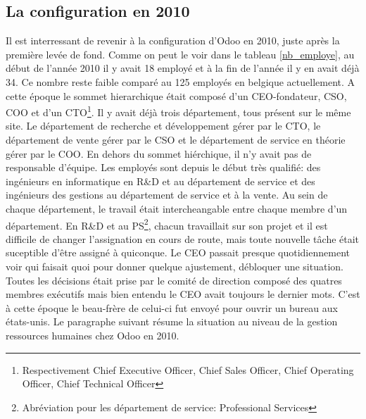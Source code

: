\subsection{La configuration en 2010}
Il est interressant de revenir à la configuration d'Odoo en 2010, juste après la première levée de fond. Comme on peut le voir dans le tableau \ref{nb_employe}, au début de l'année 2010 il y avait 18 employé et à la fin de l'année il y en avait déjà 34. Ce nombre reste faible comparé au 125 employés en belgique actuellement. A cette époque le sommet hierarchique était composé d'un CEO-fondateur, CSO, COO et d'un CTO\footnote{Respectivement Chief Executive Officer, Chief Sales Officer, Chief Operating Officer, Chief Technical Officer}. Il y avait déjà trois département, tous présent sur le même site. Le département de recherche et développement gérer par le CTO, le département de vente gérer par le CSO et le département de service en théorie gérer par le COO. En dehors du sommet hiérchique, il n'y avait pas de responsable d'équipe. Les employés sont depuis le début très qualifié: des ingénieurs en informatique en R\&D et au département de service et des ingénieurs des gestions au département de service et à la vente. Au sein de chaque département, le travail était intercheangable entre chaque membre d'un département. En R\&D et au PS\footnote{Abréviation pour les département de service: Professional Services}, chacun travaillait sur son projet et il est difficile de changer l'assignation en cours de route, mais toute nouvelle tâche était suceptible d'être assigné à quiconque. Le CEO passait presque quotidiennement voir qui faisait quoi pour donner quelque ajustement, débloquer une situation. Toutes les décisions était prise par le comité de direction composé des quatres membres exécutifs mais bien entendu le CEO avait toujours le dernier mots. C'est à cette époque le beau-frère de celui-ci fut envoyé pour ouvrir un bureau aux états-unis. Le paragraphe suivant résume la situation au niveau de la gestion ressources humaines chez Odoo en 2010.

